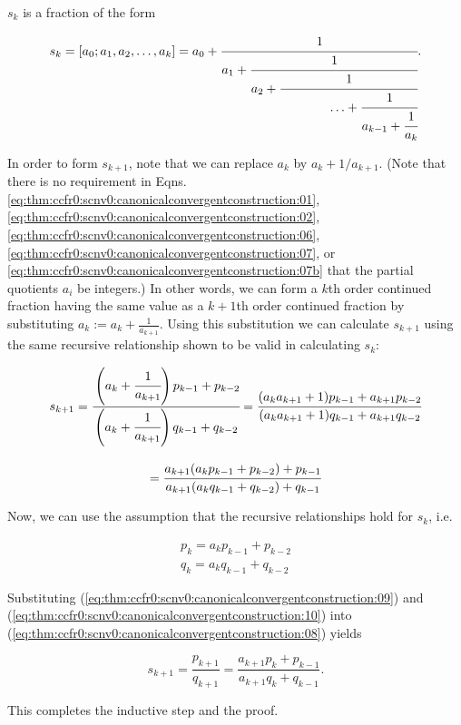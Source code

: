 \begin{vworktheoremproof}
$s_k$ is a fraction of the form

\begin{equation}
\label{eq:thm:ccfr0:scnv0:canonicalconvergentconstruction:07b}
s_k
=
[a_0; a_1, a_2, \ldots , a_k]
=
a_0 + \cfrac{1}{a_1 + \cfrac{1}{a_2
    + \cfrac{1}{\;\;\;\;\;\;\;\;\;\;\;\;\;\;\ldots + 
	\cfrac{1}{a_{k-1} + \cfrac{1}{a_k}}}}} .
\end{equation}

In order to form $s_{k+1}$, note that we can replace $a_k$ by
$a_k + 1/a_{k + 1}$.  (Note that there is no requirement
in Eqns. \ref{eq:thm:ccfr0:scnv0:canonicalconvergentconstruction:01},
\ref{eq:thm:ccfr0:scnv0:canonicalconvergentconstruction:02},
\ref{eq:thm:ccfr0:scnv0:canonicalconvergentconstruction:06},
\ref{eq:thm:ccfr0:scnv0:canonicalconvergentconstruction:07},
or \ref{eq:thm:ccfr0:scnv0:canonicalconvergentconstruction:07b}
that the partial quotients $a_i$ be integers.)
In other words, we can form a
$k$th order continued fraction having the same value as a 
$k+1$th order continued fraction by substituting
$a_k := a_k + \frac{1}{a_{k + 1}}$.  Using this substitution
we can calculate $s_{k+1}$ using the same recursive
relationship shown to be valid in calculating $s_k$:

\begin{equation}
\label{eq:thm:ccfr0:scnv0:canonicalconvergentconstruction:08}
\begin{array}{c}
s_{k+1} = 
\cfrac
{\left( {a_k+\cfrac{1}{a_{k+1}} } \right) p_{k-1} + p_{k-2}}
{\left( {a_k+\cfrac{1}{a_{k+1}} } \right) q_{k-1} + q_{k-2}}
=
\cfrac
{(a_k a_{k+1} + 1) p_{k-1} + a_{k+1} p_{k-2}}
{(a_k a_{k+1} + 1) q_{k-1} + a_{k+1} q_{k-2}} \\
  \\
=
\cfrac
{a_{k+1} (a_k p_{k-1} + p_{k-2}) + p_{k-1}}
{a_{k+1} (a_k q_{k-1} + q_{k-2}) + q_{k-1}}
\end{array}
\end{equation}

Now, we can use the assumption that the recursive relationships
hold for $s_k$, i.e.

\begin{eqnarray}
\label{eq:thm:ccfr0:scnv0:canonicalconvergentconstruction:09}
p_k = a_k p_{k-1} + p_{k-2} \\
\label{eq:thm:ccfr0:scnv0:canonicalconvergentconstruction:10}
q_k = a_k q_{k-1} + q_{k-2}
\end{eqnarray}

Substituting 
(\ref{eq:thm:ccfr0:scnv0:canonicalconvergentconstruction:09}) and
(\ref{eq:thm:ccfr0:scnv0:canonicalconvergentconstruction:10}) into
(\ref{eq:thm:ccfr0:scnv0:canonicalconvergentconstruction:08}) yields

\begin{equation}
\label{eq:thm:ccfr0:scnv0:canonicalconvergentconstruction:11}
s_{k+1} = \frac{p_{k+1}}{q_{k+1}}
= \frac{a_{k+1} p_k + p_{k-1}}{a_{k+1} q_k + q_{k-1}}  .
\end{equation}

\noindent{}This completes the inductive step and the proof.
\end{vworktheoremproof}
